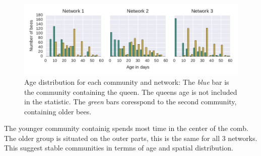 \begin{figure}[htb]
	\centering
	\includegraphics[width=1.0\textwidth]{Figures/ageDistribution}
	\caption[Age distribution for each community and network] {Age distribution for each community and network: The \emph{blue} bar is the community containing the queen. The queens age is not included in the statistic. The \emph{green} bars coresspond to the second community, containing older bees.}
	\label{fig:ageDistribution}
\end{figure}


The younger community containig spends most time in the center of the comb. The older group is situated on the outer parts, this is the same for all 3 networks. This suggest stable communities in termns of age and spatial distribution.

